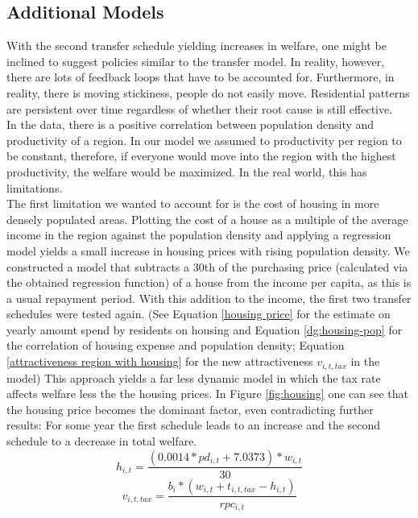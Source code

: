 \documentclass[10pt,a4paper]{article}
\begin{document}
\subsection{Additional Models}
With the second transfer schedule yielding increases in welfare, one might be inclined to suggest policies similar to the transfer model. In reality, however, there are lots of feedback loops that have to be accounted for. Furthermore, in reality, there is moving stickiness, people do not easily move. Residential patterns are persistent over time regardless of whether their root cause is still effective. \cite{heblich2021eastside}
\\
In the data, there is a positive correlation between population density and productivity of a region. In our model we assumed to productivity per region to be constant, therefore, if everyone would move into the region with the highest productivity, the welfare would be maximized. In the real world, this has limitations.
\\
The first limitation we wanted to account for is the cost of housing in more densely populated areas. Plotting the cost of a house as a multiple of the average income in the region against the population density and applying a regression model yields a small increase in housing prices with rising population density. We constructed a model that subtracts a 30th of the purchasing price (calculated via the obtained regression function) of a house from the income per capita, as this is a usual repayment period. With this addition to the income, the first two transfer schedules were tested again. (See Equation \ref{housing price} for the estimate on yearly amount spend by residents on housing and Equation \ref{dg:housing-pop} for the correlation of housing expense and population density; Equation \ref{attractiveness region with housing} for the new attractiveness $v_{i,t,tax}$ in the model) This approach yields a far less dynamic model in which the tax rate affects welfare less the the housing prices. In Figure \ref{fig:housing} one can see that the housing price becomes the dominant factor, even contradicting further results: For some year the first schedule leads to an increase and the second schedule to a decrease in total welfare.
\\
\begin{equation}
    h_{i,t} = \frac{(0.0014*pd_{i,t}+7.0373) * w_{i,t}}{30}
    \label{housing price}
\end{equation}
\begin{equation}
    v_{i,t,tax} = \frac{b_i*(w_{i,t}+t_{i,t,tax}-h_{i,t})}{rpc_{i,t}}
    \label{attractiveness region with housing}
\end{equation}
\end{document}
